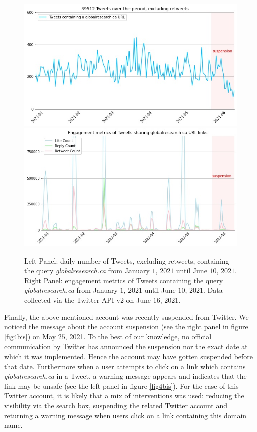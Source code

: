 \documentclass{article}
\begin{document}
\begin{figure}[h]
\centering
		\includegraphics[scale=0.35]{./img/globalresearch/sum_globalresearch.ca_6_months.jpg} 
		\includegraphics[scale=0.35]{./img/globalresearch/engagement_sum_rolling_1_globalresearch.ca.jpg}
\caption{Left Panel: daily number of Tweets, excluding retweets, containing the query {\it globalresearch.ca} from January $1$, $2021$ until June $10$, $2021$. Right Panel: engagement metrics of Tweets containing the query {\it globalresearch.ca} from January $1$, $2021$ until June $10$, $2021$. Data collected via the Twitter API v2 on June $16$, 2021.   }
\label{fig4}
\end{figure}

Finally, the above mentioned account was recently suspended from Twitter. We noticed the message about the account suspension (see the right panel in figure \ref{fig4bis}) on May $25$, 2021. To the best of our knowledge, no official communication by Twitter has announced the suspension nor the exact date at which it was implemented. Hence the account may have gotten suspended before that date. Furthermore when a user attempts to click on a link which contains {\it globalresearch.ca} in a Tweet, a warning message appears and indicates that the link may be unsafe (see the left panel in figure \ref{fig4bis}). For the case of this Twitter account, it is likely that a mix of interventions was used: reducing the visibility via the search box, suspending the related Twitter account and returning a warning message when users click on a link containing this domain name.  
\end{document}
